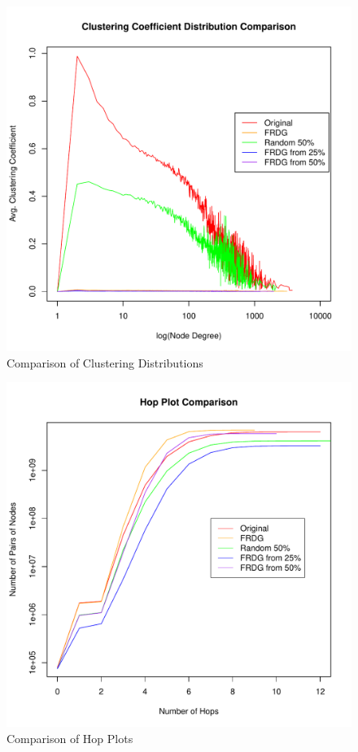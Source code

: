 \documentclass[pdftex,11pt,a4paper,twocolumn]{scrartcl}
\begin{document}
\begin{figure}[h!]
\centering
\includegraphics[width=\columnwidth]{bestsComparison_clustering.pdf} 
\caption{Comparison of Clustering Distributions \label{fig:bestCluster}}
\end{figure}

\pagebreak

\begin{figure}[h!]
\centering
\includegraphics[width=\columnwidth]{bestsComparison_hop.pdf} 
\caption{Comparison of Hop Plots \label{fig:bestHop}}
\end{figure}
\end{document}
